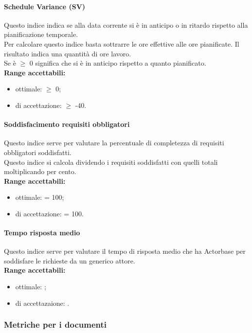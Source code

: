 \documentclass{scalatekids-article}
\begin{document}
\paragraph{Schedule Variance (SV)}
Questo indice indica se alla data corrente si è in anticipo o in ritardo rispetto alla pianificazione temporale.\\ Per calcolare questo indice basta sottrarre le ore effettive alle ore pianificate. Il risultato indica una quantità di ore lavoro.\\
Se  è $\geq$ 0 significa che si è in anticipo rispetto a quanto pianificato.\\
\textbf{Range accettabili:}
\begin{itemize}
  \item {} ottimale: $\geq$ 0;
  \item {} di accettazione: $\geq$ -40.
\end{itemize}

\paragraph{Soddisfacimento requisiti obbligatori}
Questo indice serve per valutare la percentuale di completezza di requisiti obbligatori soddisfatti.\\Questo indice si calcola dividendo i requisiti soddisfatti con quelli totali moltiplicando per cento.\\
\textbf{Range accettabili:}
\begin{itemize}
  \item {} ottimale: = 100;
  \item {} di accettazione: = 100.
\end{itemize}

\paragraph{Tempo risposta medio}
Questo indice serve per valutare il tempo di risposta medio che ha Actorbase per soddisfare le richieste da un generico attore.\\
\textbf{Range accettabili:}
\begin{itemize}
  \item {} ottimale: ; %
  \item {} di accettazaione: .
\end{itemize}

\subsubsection{Metriche per i documenti}
\end{document}
